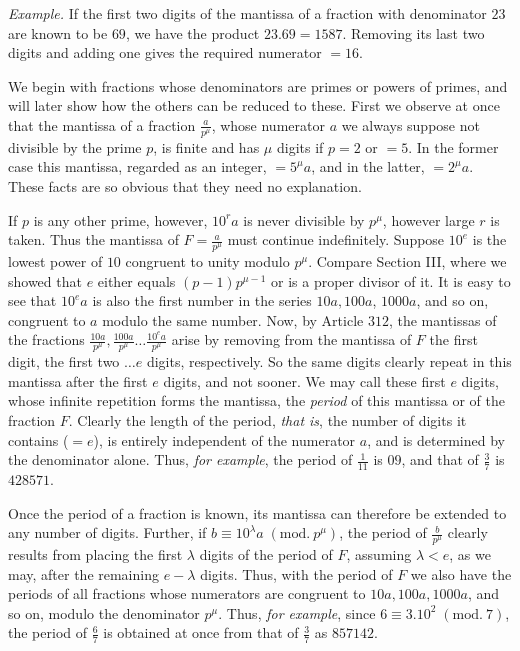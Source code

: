 \textit{Example.} If the first two digits of the mantissa of a fraction with denominator \(23\) are known to be \(69\), we have the product \(23.69=1587\). Removing its last two digits and adding one gives the required numerator \(=16\).

We begin with fractions whose denominators are primes or powers of primes, and will later show how the others can be reduced to these. First we observe at once that the mantissa of a fraction \(\frac a{p^\mu}\), whose numerator \(a\) we always suppose not divisible by the prime \(p\), is finite and has \(\mu\) digits if \(p=2\) or \(=5\). In the former case this mantissa, regarded as an integer, \(=5^\mu a\), and in the latter, \(=2^\mu a\). These facts are so obvious that they need no explanation.

If \(p\) is any other prime, however, \(10^r a\) is never divisible by \(p^\mu\), however large \(r\) is taken. Thus the mantissa of \(F=\frac a{p^\mu}\) must continue indefinitely. Suppose \(10^e\) is the lowest power of \(10\) congruent to unity modulo \(p^\mu\). Compare Section III, where we showed that \(e\) either equals \((p-1)p^{\mu-1}\) or is a proper divisor of it. It is easy to see that \(10^e a\) is also the first number in the series \(10a,100a\), \(1000a\), and so on, congruent to \(a\) modulo the same number. Now, by Article \(312\), the mantissas of the fractions \(\frac{10a}{p^\mu},\frac{100a}{p^\mu}\ldots\frac{10^e a}{p^\mu}\) arise by removing from the mantissa
of \(F\) the first digit, the first two \(\ldots e\) digits, respectively. So the same digits clearly repeat in this mantissa after the first \(e\) digits, and not sooner. We may call these first \(e\) digits, whose infinite repetition forms the mantissa, the \textit{period} of this mantissa or of the fraction \(F\). Clearly the length of the period, \textit{that is}, the number of digits it contains (\(=e\)), is entirely independent of the numerator \(a\), and is determined by the denominator alone. Thus, \textit{for example}, the period of \(\frac1{11}\) is \(09\), and that of \(\frac37\) is \(428571\).

Once the period of a fraction is known, its mantissa can therefore be extended to any number of digits. Further, if \(b\equiv10^\lambda a\; (\mathrm{mod}.\ p^\mu)\), the period of \(\frac b{p^\mu}\) clearly results from placing the first \(\lambda\) digits of the period of \(F\), assuming \(\lambda<e\), as we may, after the remaining \(e-\lambda\) digits. Thus, with the period of \(F\) we also have the periods of all fractions whose numerators are congruent to \(10a,100a,1000a\), and so on, modulo the denominator \(p^\mu\). Thus, \textit{for example}, since \(6\equiv3.10^2\; (\mathrm{mod}.\ 7)\), the period of \(\frac67\) is obtained at once from that of \(\frac37\) as \(857142\).

